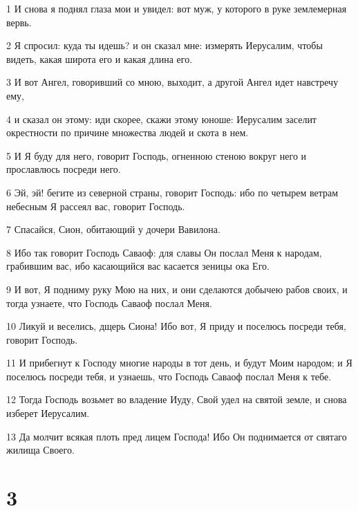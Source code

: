 \par 1 И снова я поднял глаза мои и увидел: вот муж, у которого в руке землемерная вервь.
\par 2 Я спросил: куда ты идешь? и он сказал мне: измерять Иерусалим, чтобы видеть, какая широта его и какая длина его.
\par 3 И вот Ангел, говоривший со мною, выходит, а другой Ангел идет навстречу ему,
\par 4 и сказал он этому: иди скорее, скажи этому юноше: Иерусалим заселит окрестности по причине множества людей и скота в нем.
\par 5 И Я буду для него, говорит Господь, огненною стеною вокруг него и прославлюсь посреди него.
\par 6 Эй, эй! бегите из северной страны, говорит Господь: ибо по четырем ветрам небесным Я рассеял вас, говорит Господь.
\par 7 Спасайся, Сион, обитающий у дочери Вавилона.
\par 8 Ибо так говорит Господь Саваоф: для славы Он послал Меня к народам, грабившим вас, ибо касающийся вас касается зеницы ока Его.
\par 9 И вот, Я подниму руку Мою на них, и они сделаются добычею рабов своих, и тогда узнаете, что Господь Саваоф послал Меня.
\par 10 Ликуй и веселись, дщерь Сиона! Ибо вот, Я приду и поселюсь посреди тебя, говорит Господь.
\par 11 И прибегнут к Господу многие народы в тот день, и будут Моим народом; и Я поселюсь посреди тебя, и узнаешь, что Господь Саваоф послал Меня к тебе.
\par 12 Тогда Господь возьмет во владение Иуду, Свой удел на святой земле, и снова изберет Иерусалим.
\par 13 Да молчит всякая плоть пред лицем Господа! Ибо Он поднимается от святаго жилища Своего.

\chapter{3}

